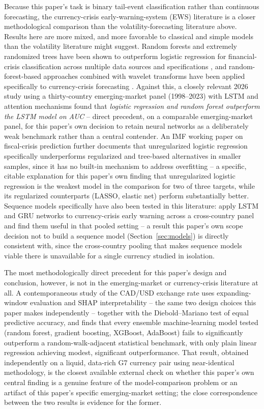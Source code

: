 \documentclass[final,3p,times,authoryear]{elsarticle}
\begin{document}
Because this paper's task is binary tail-event classification rather
than continuous forecasting, the currency-crisis early-warning-system
(EWS) literature is a closer methodological comparison than the
volatility-forecasting literature above. Results here are more mixed,
and more favorable to classical and simple models than the volatility
literature might suggest. Random forests and extremely randomized trees
have been shown to outperform logistic regression for financial-crisis
classification across multiple data sources and specifications
\citep{crisisrf2024}, and random-forest-based approaches combined with
wavelet transforms have been applied specifically to currency-crisis
forecasting \citep{rfcrisis2025}. Against this, a closely relevant 2026
study using a thirty-country emerging-market panel (1998--2023) with
LSTM and attention mechanisms found that \emph{logistic regression and
random forest outperform the LSTM model on AUC} \citep{lstmattention2026}
-- direct precedent, on a comparable emerging-market panel, for this
paper's own decision to retain neural networks as a deliberately weak
benchmark rather than a central contender. An IMF working paper on
fiscal-crisis prediction further documents that unregularized logistic
regression specifically underperforms regularized and tree-based
alternatives in smaller samples, since it has no built-in mechanism to
address overfitting \citep{imf2021fiscal} -- a specific, citable
explanation for this paper's own finding that unregularized logistic
regression is the weakest model in the comparison for two of three
targets, while its regularized counterparts (LASSO, elastic net) perform
substantially better. Sequence models specifically have also been tested
in this literature: \citet{barthelemy2024} apply LSTM and GRU networks
to currency-crisis early warning across a cross-country panel and find
them useful in that pooled setting -- a result this paper's own scope
decision not to build a sequence model (Section~\ref{sec:models}) is
directly consistent with, since the cross-country pooling that makes
sequence models viable there is unavailable for a single currency
studied in isolation.

The most methodologically direct precedent for this paper's design and
conclusion, however, is not in the emerging-market or currency-crisis
literature at all. A contemporaneous study of the CAD/USD exchange rate
\citep{caudsdstudy2026} uses expanding-window evaluation and SHAP
interpretability -- the same two design choices this paper makes
independently -- together with the Diebold--Mariano test of equal
predictive accuracy, and finds that every ensemble machine-learning
model tested (random forest, gradient boosting, XGBoost, AdaBoost) fails
to significantly outperform a random-walk-adjacent statistical
benchmark, with only plain linear regression achieving modest,
significant outperformance. That result, obtained independently on a
liquid, data-rich G7 currency pair using near-identical methodology,
is the closest available external check on whether this paper's own
central finding is a genuine feature of the model-comparison problem or
an artifact of this paper's specific emerging-market setting; the
close correspondence between the two results is evidence for the
former.
\end{document}
